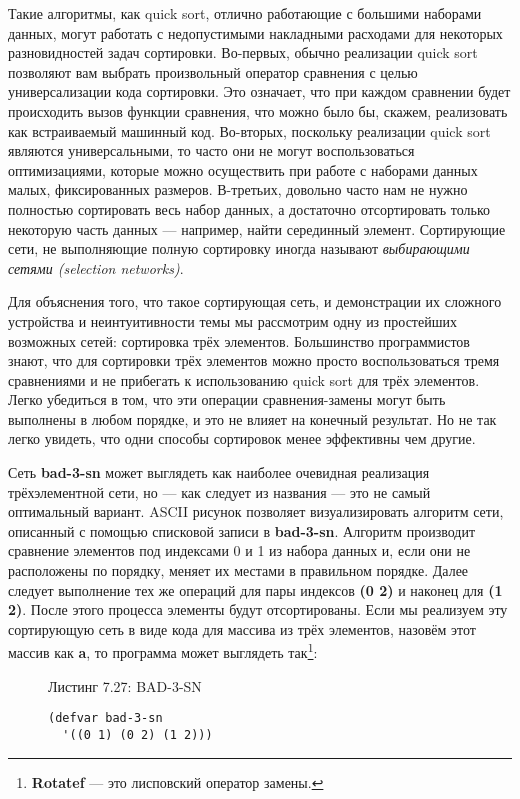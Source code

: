 Такие алгоритмы, как quick sort, отлично работающие с большими наборами данных, могут работать с недопустимыми накладными расходами для некоторых разновидностей задач сортировки. Во-первых, обычно реализации quick sort позволяют вам выбрать произвольный оператор сравнения с целью универсализации кода сортировки. Это означает, что при каждом сравнении будет происходить вызов функции сравнения, что можно было бы, скажем, реализовать как встраиваемый машинный код. Во-вторых, поскольку реализации quick sort являются универсальными, то часто они не могут воспользоваться оптимизациями, которые можно осуществить при работе с наборами данных малых, фиксированных размеров. В-третьих, довольно часто нам не нужно полностью сортировать весь набор данных, а достаточно отсортировать только некоторую часть данных --- например, найти серединный элемент. Сортирующие сети, не выполняющие полную сортировку иногда называют \emph{выбирающими сетями (selection networks)}.

Для объяснения того, что такое сортирующая сеть, и демонстрации их сложного устройства и неинтуитивности темы мы рассмотрим одну из простейших возможных сетей: сортировка трёх элементов. Большинство программистов знают, что для сортировки трёх элементов можно просто воспользоваться тремя сравнениями и не прибегать к использованию quick sort для трёх элементов. Легко убедиться в том, что эти операции сравнения-замены могут быть выполнены в любом порядке, и это не влияет на конечный результат. Но не так легко увидеть, что одни способы сортировок менее эффективны чем другие.

Сеть \textbf{bad-3-sn} может выглядеть как наиболее очевидная реализация трёхэлементной сети, но --- как следует из названия --- это не самый оптимальный вариант. ASCII рисунок позволяет визуализировать алгоритм сети, описанный с помощью списковой записи в \textbf{bad-3-sn}. Алгоритм производит сравнение элементов под индексами 0 и 1 из набора данных и, если они не расположены по порядку, меняет их местами в правильном порядке. Далее следует выполнение тех же операций для пары индексов \textbf{(0 2)} и наконец для \textbf{(1 2)}. После этого процесса элементы будут отсортированы. Если мы реализуем эту сортирующую сеть в виде кода для массива из трёх элементов, назовём этот массив как \textbf{a}, то программа может выглядеть так\footnote{\textbf{Rotatef} --- это лисповский оператор замены.}:

\begin{figure}Листинг 7.27: BAD-3-SN\label{listing_7.27}
\listbegin
\begin{verbatim}
(defvar bad-3-sn
  '((0 1) (0 2) (1 2))) 
\end{verbatim}
\listend
\end{figure}

